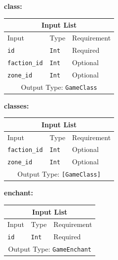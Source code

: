 \documentclass[10pt, a4paper]{memoir}
\numberwithin{equation}{section}
\theoremstyle{plain}
\theoremstyle{defp}
\theoremstyle{dotless}
\theoremstyle{definition}
\theoremstyle{dotless}
\theoremstyle{dotless}
\theoremstyle{defp}
\theoremstyle{defp}
\theoremstyle{be}          %
\theoremstyle{defp}
\newcommand\ttt[1]{\texttt{#1}}
\begin{document}
\medskip

\textbf{class:}

\begin{table}[h!]
	\centering
	\begin{tabular}{ |p{4.2cm}|p{6cm}|p{3cm}|  }
		\hline
		\multicolumn{3}{|c|}{Input List} \\
		\hline
		Input & Type & Requirement\\
		\hline
		\ttt{id} & \ttt{Int} & Required\\
		\ttt{faction\_id} & \ttt{Int} & Optional\\
		\ttt{zone\_id} & \ttt{Int} & Optional\\
		\hline
		\multicolumn{3}{|c|}{Output Type: \ttt{GameClass}} \\
		\hline
	\end{tabular}
\end{table}

\medskip

\textbf{classes:}

\begin{table}[h!]
	\centering
	\begin{tabular}{ |p{4.2cm}|p{6cm}|p{3cm}|  }
		\hline
		\multicolumn{3}{|c|}{Input List} \\
		\hline
		Input & Type & Requirement\\
		\hline
		\ttt{faction\_id} & \ttt{Int} & Optional\\
		\ttt{zone\_id} & \ttt{Int} & Optional\\
		\hline
		\multicolumn{3}{|c|}{Output Type: \ttt{[GameClass]}} \\
		\hline
	\end{tabular}
\end{table}

\newpage

\textbf{enchant:}

\begin{table}[h!]
	\centering
	\begin{tabular}{ |p{4.2cm}|p{6cm}|p{3cm}|  }
		\hline
		\multicolumn{3}{|c|}{Input List} \\
		\hline
		Input & Type & Requirement\\
		\hline
		\ttt{id} & \ttt{Int} & Required\\
		\hline
		\multicolumn{3}{|c|}{Output Type: \ttt{GameEnchant}} \\
		\hline
	\end{tabular}
\end{table}

\medskip
\end{document}
